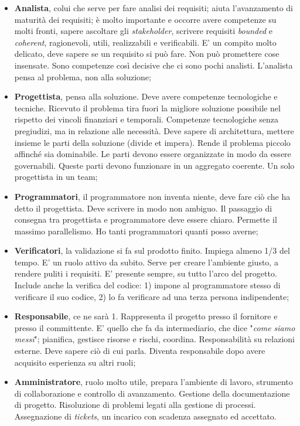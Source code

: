 \begin{itemize}

	\item \textbf{Analista}, colui che serve per fare analisi dei requisiti; aiuta l'avanzamento di maturità dei requisiti; è molto importante e occorre avere competenze su molti fronti, sapere ascoltare gli \textit{stakeholder}, scrivere requisiti \textit{bounded} e \textit{coherent}, ragionevoli, utili, realizzabili e verificabili. E'  un compito molto delicato, deve sapere se un requisito si può fare. Non può promettere cose insensate. Sono competenze così decisive che ci sono pochi analisti. L'analista pensa al problema, non alla soluzione;
	
	\item \textbf{Progettista}, pensa alla soluzione. Deve avere competenze tecnologiche e tecniche. Ricevuto il problema tira fuori la migliore soluzione possibile nel rispetto dei vincoli finanziari e temporali. Competenze tecnologiche senza pregiudizi, ma in relazione alle necessità. Deve sapere di architettura, mettere insieme le parti della soluzione (divide et impera). Rende il problema piccolo affinché sia dominabile. Le parti devono essere organizzate in modo da essere governabili. Queste parti devono funzionare in un aggregato coerente. Un solo progettista in un team;
	
	\item \textbf{Programmatori}, il programmatore non inventa niente, deve fare ciò che ha detto il progettista. Deve scrivere in modo non ambiguo. Il passaggio di consegna tra progettista e programmatore deve essere chiaro. Permette il massimo parallelismo. Ho tanti programmatori quanti posso averne;
	
	\item \textbf{Verificatori}, la validazione si fa sul prodotto finito. Impiega almeno 1/3 del tempo. E' un ruolo attivo da subito. Serve per creare l'ambiente giusto, a rendere puliti i requisiti. E' presente sempre, su tutto l'arco del progetto. Include anche la verifica del codice: 1) impone al programmatore stesso di verificare il suo codice, 2) lo fa verificare ad una terza persona indipendente;
	
	\item \textbf{Responsabile}, ce ne sarà 1. Rappresenta il progetto presso il fornitore e presso il committente. E' quello che fa da intermediario, che dice "\textit{come siamo messi}"; pianifica, gestisce risorse e rischi, coordina. Responsabilità su relazioni esterne. Deve sapere ciò di cui parla. Diventa responsabile dopo avere acquisito esperienza su altri ruoli;
	
	\item \textbf{Amministratore}, ruolo molto utile, prepara l'ambiente di lavoro, strumento di collaborazione e controllo di avanzamento. Gestione della documentazione di progetto. Risoluzione di problemi legati alla gestione di processi. Assegnazione di \textit{tickets}, un incarico con scadenza assegnato ed accettato.


\end{itemize}